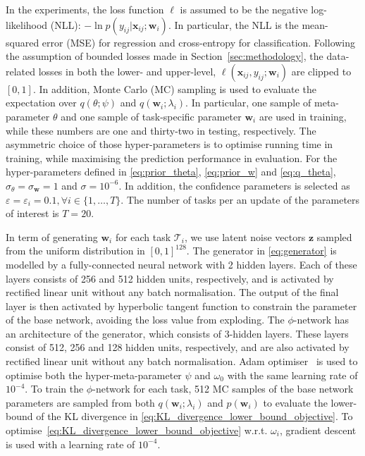     In the experiments, the loss function \(\ell\) is assumed to be the negative log-likelihood (NLL): \(-\ln p(y_{ij} | \mathbf{x}_{ij}; \mathbf{w}_{i})\). In particular, the NLL is the mean-squared error (MSE) for regression and cross-entropy for classification. Following the assumption of bounded losses made in Section~\ref{sec:methodology}, the data-related losses in both the lower- and upper-level, \(\ell(\mathbf{x}_{ij}, y_{ij}; \mathbf{w}_{i})\) are clipped to \([0, 1]\). In addition, Monte Carlo (MC) sampling is used to evaluate the expectation over \(q(\theta; \psi)\) and \(q(\mathbf{w}_{i}; \lambda_{i})\). In particular, one sample of meta-parameter \(\theta\) and one sample of task-specific parameter \(\mathbf{w}_{i}\) are used in training, while these numbers are one and thirty-two in testing, respectively. The asymmetric choice of those hyper-parameters is to optimise running time in training, while maximising the prediction performance in evaluation. For the hyper-parameters defined in \eqref{eq:prior_theta}, \eqref{eq:prior_w} and \eqref{eq:q_theta}, \(\sigma_{\theta} = \sigma_{\mathbf{w}} = 1\) and \(\sigma = 10^{-6}\). In addition, the confidence parameters is selected as \(\varepsilon = \varepsilon_{i} = 0.1, \forall i \in \{1, \ldots, T\}\). The number of tasks per an update of the parameters of interest is \(T = 20\).

    In term of generating \(\mathbf{w}_{i}\) for each task \(\mathcal{T}_{i}\), we use latent noise vectors \(\mathbf{z}\) sampled from the uniform distribution in \([0, 1]^{128}\). The generator in \eqref{eq:generator} is modelled by a fully-connected neural network with 2 hidden layers. Each of these layers consists of 256 and 512 hidden units, respectively, and is activated by rectified linear unit without any batch normalisation. The output of the final layer is then activated by hyperbolic tangent function to constrain the parameter of the base network, avoiding the loss value from exploding. The \(\phi\)-network has an  architecture of the generator, which consists of 3-hidden layers. These layers consist of 512, 256 and 128 hidden units, respectively, and are also activated by rectified linear unit without any batch normalisation. Adam optimiser~\citep{kingma2015adam} is used to optimise both the hyper-meta-parameter \(\psi\) and \(\omega_{0}\) with the same learning rate of \(10^{-4}\). To train the \(\phi\)-network for each task, 512 MC samples of the base network parameters are sampled from both \(q(\mathbf{w}_{i}; \lambda_{i})\) and \(p(\mathbf{w}_{i})\) to evaluate the lower-bound of the KL divergence in \eqref{eq:KL_divergence_lower_bound_objective}. To optimise~\eqref{eq:KL_divergence_lower_bound_objective} w.r.t. \(\omega_{i}\), gradient descent is used with a learning rate of \(10^{-4}\). 

